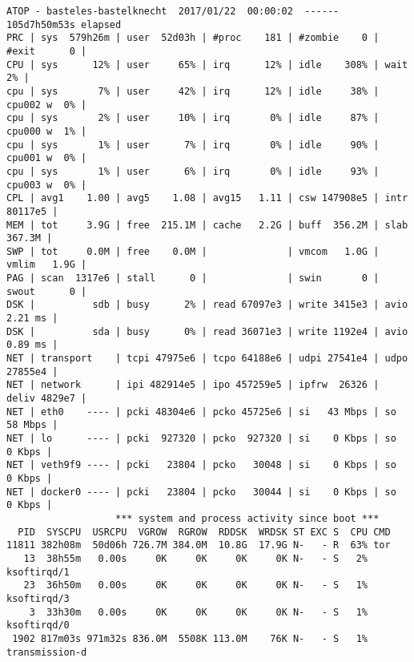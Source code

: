 %
\begin{lstlisting}[caption={atop ASCII Logausgabe},label=lst:atop]
ATOP - basteles-bastelknecht  2017/01/22  00:00:02  ------  105d7h50m53s elapsed
PRC | sys  579h26m | user  52d03h | #proc    181 | #zombie    0 | #exit      0 |
CPU | sys      12% | user     65% | irq      12% | idle    308% | wait      2% |
cpu | sys       7% | user     42% | irq      12% | idle     38% | cpu002 w  0% |
cpu | sys       2% | user     10% | irq       0% | idle     87% | cpu000 w  1% |
cpu | sys       1% | user      7% | irq       0% | idle     90% | cpu001 w  0% |
cpu | sys       1% | user      6% | irq       0% | idle     93% | cpu003 w  0% |
CPL | avg1    1.00 | avg5    1.08 | avg15   1.11 | csw 147908e5 | intr 80117e5 |
MEM | tot     3.9G | free  215.1M | cache   2.2G | buff  356.2M | slab  367.3M |
SWP | tot     0.0M | free    0.0M |              | vmcom   1.0G | vmlim   1.9G |
PAG | scan  1317e6 | stall      0 |              | swin       0 | swout      0 |
DSK |          sdb | busy      2% | read 67097e3 | write 3415e3 | avio 2.21 ms |
DSK |          sda | busy      0% | read 36071e3 | write 1192e4 | avio 0.89 ms |
NET | transport    | tcpi 47975e6 | tcpo 64188e6 | udpi 27541e4 | udpo 27855e4 |
NET | network      | ipi 482914e5 | ipo 457259e5 | ipfrw  26326 | deliv 4829e7 |
NET | eth0    ---- | pcki 48304e6 | pcko 45725e6 | si   43 Mbps | so   58 Mbps |
NET | lo      ---- | pcki  927320 | pcko  927320 | si    0 Kbps | so    0 Kbps |
NET | veth9f9 ---- | pcki   23804 | pcko   30048 | si    0 Kbps | so    0 Kbps |
NET | docker0 ---- | pcki   23804 | pcko   30044 | si    0 Kbps | so    0 Kbps |
                   *** system and process activity since boot ***
  PID  SYSCPU  USRCPU  VGROW  RGROW  RDDSK  WRDSK ST EXC S  CPU CMD
11811 382h08m  50d06h 726.7M 384.0M  10.8G  17.9G N-   - R  63% tor
   13  38h55m   0.00s     0K     0K     0K     0K N-   - S   2% ksoftirqd/1
   23  36h50m   0.00s     0K     0K     0K     0K N-   - S   1% ksoftirqd/3
    3  33h30m   0.00s     0K     0K     0K     0K N-   - S   1% ksoftirqd/0
 1902 817m03s 971m32s 836.0M  5508K 113.0M    76K N-   - S   1% transmission-d
\end{lstlisting}
